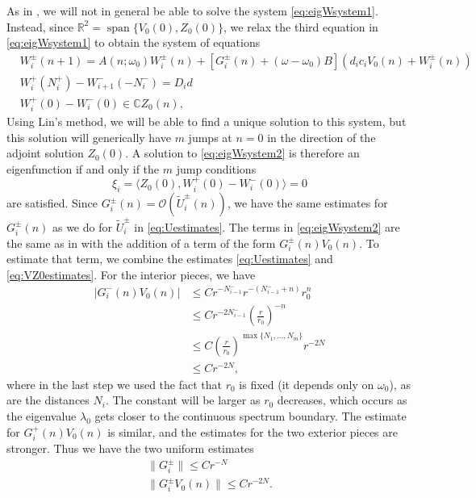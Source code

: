 \documentclass[12pt]{article}
\def\R{{\mathbb R}}
\def\C{{\mathbb C}}
\DeclareMathOperator{\spn}{span}
\begin{document}
As in \cites{Parker2020,Sandstede1998}, we will not in general be able to solve the system \cref{eq:eigWsystem1}. Instead, since $\R^2 = \spn\{ V_0(0), Z_0(0) \}$, we relax the third equation in \cref{eq:eigWsystem1} to obtain the system of equations
\begin{equation}\label{eq:eigWsystem2}
	\begin{aligned}
	& W_i^\pm(n+1)
	= A(n; \omega_0) W_i^\pm(n) + [G_i^\pm(n) + (\omega - \omega_0) B](d_i c_i V_0(n) + W_i^\pm(n))\\
	& W_i^+(N_i^+) - W_{i+1}^-(-N_i^-) = D_i d \\
	&W_i^+(0) - W_i^-(0) \in \C Z_0(n),
	\end{aligned}
\end{equation}
Using Lin's method, we will be able to find a unique solution to this system, but this solution will generically have $m$ jumps at $n = 0$ in the direction of the adjoint solution $Z_0(0)$. A solution to \cref{eq:eigWsystem2} is therefore an eigenfunction if and only if the $m$ jump conditions
\begin{equation}
	\xi_i = \langle Z_0(0), W_i^+(0) - W_i^-(0) \rangle = 0
\end{equation}
are satisfied. Since $G_i^\pm(n) = \mathcal{O}(\tilde{U}_i^\pm(n))$, we have the same estimates for $G_i^\pm(n)$ as we do for $\tilde{U}_i^\pm$ in \cref{eq:Uestimates}. The terms in \cref{eq:eigWsystem2} are the same as in \cite{Parker2020} with the addition of a term of the form $G_i^\pm(n) V_0(n)$. To estimate that term, we combine the estimates \cref{eq:Uestimates} and \cref{eq:VZ0estimates}. For the interior pieces, we have
\begin{align*}
| G_i^-(n) V_0(n) | &\leq C r^{-N_{i-1}^-} r^{-(N_{i-1}^- + n)} r_0^n \\
&\leq C r^{-2 N_{i-1}^-} \left(\frac{r}{r_0}\right)^{-n} \\
&\leq C \left(\frac{r}{r_0}\right)^{\max\{N_1, \dots, N_m\}} r^{-2 N} \\
&\leq C r^{-2 N} ,
\end{align*}
where in the last step we used the fact that $r_0$ is fixed (it depends only on $\omega_0$), as are the distances $N_i$. The constant will be larger as $r_0$ decreases, which occurs as the eigenvalue $\lambda_0$ gets closer to the continuous spectrum boundary. The estimate for $G_i^+(n) V_0(n)$ is similar, and the estimates for the two exterior pieces are stronger. Thus we have the two uniform estimates
\begin{equation}\label{eq:unifest}
	\begin{aligned}
		\|G_i^\pm\| \leq C r^{-N} \\
		\|G_i^\pm V_0(n) \| \leq C r^{-2 N}.
	\end{aligned}
\end{equation}
\end{document}
